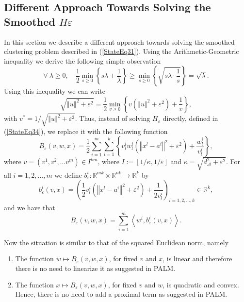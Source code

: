 \documentclass[11pt]{article}
\numberwithin{equation}{section}
\newcommand{\rr}{\mathbb{R}} %
\newcommand{\norm}[1]{\left\Vert {#1} \right\Vert} %
\begin{document}
\newpage

\subsection{Different Approach Towards Solving the Smoothed $H\varepsilon$}
In this section we describe a different approach towards solving the smoothed clustering problem described in (\ref{StateEq31}). Using the  Arithmetic-Geometric inequality we derive the following simple observation
\begin{equation*}
	\forall \: \lambda \geq 0, \quad \frac{1}{2} \min\limits_{s \geq 0} \left\lbrace s\lambda + \frac{1}{\lambda} \right\rbrace \geq \min\limits_{s \geq 0} \left\lbrace \sqrt{s\lambda \cdot \frac{1}{s}} \right\rbrace = \sqrt{\lambda} .
\end{equation*}
Using this inequality we can write
\begin{equation}
	\sqrt{\norm{u}^2 + {\varepsilon}^2} = \frac{1}{2}\min\limits_{v \geq 0} \left\lbrace v\left( \norm{u}^2 + {\varepsilon}^2\right) + \frac{1}{v} \right\rbrace , \label{AG_inq}
\end{equation}
with $v^* = 1/\sqrt{\norm{u}^2 + {\varepsilon}^2}$.
Thus, instead of solving $H_\varepsilon$ directly, defined in (\ref{StateEq34}), we replace it with the following function
\begin{equation}
	B_{\varepsilon}(v,w,x) = \frac{1}{2}\sum\limits_{i=1}^{m} \sum\limits_{l=1}^{k} \left\lbrace v^i_lw^i_l \left( \norm{x^l-a^i}^2 +{\varepsilon}^2 \right) + \frac{w^i_l}{v^i_l} \right\rbrace ,
\end{equation}
where $v = \left(v^1, v^2, \ldots v^m \right) \in I^{km}$, where $I:=\left[1/\kappa, 1/\varepsilon\right]$ and $\kappa = \sqrt{ d_{\mathcal{A}}^2 + {\varepsilon}^2}$. For all $i=1,2,\ldots,m$ we define $b^i_{\varepsilon}: \rr^{mk} \times \rr^{nk} \rightarrow \rr^{k}$ by
\begin{equation*}
	b^i_{\varepsilon}(v,x)= \left( \frac{1}{2} v^i_l \left( \norm{x^l-a^i}^2 +{\varepsilon}^2 \right) + \frac{1}{2v^i_l} \right)_{l=1,2,\ldots,k} \in \rr^{k} ,
\end{equation*}
and we have that
\begin{equation}
	B_{\varepsilon}(v,w,x) = \sum\limits_{i=1}^m \left\langle w^i, b^i_{\varepsilon}(v,x) \right\rangle . \label{B_eq_sum_b}
\end{equation}

Now the situation is similar to that of the squared Euclidean norm, namely
\begin{enumerate}[(1)]
	\item The function $w \mapsto B_{\varepsilon}(v,w,x)$, for fixed $v$ and $x$, is linear and therefore there is no need to linearize it as suggested in PALM.
	\item The function $x \mapsto B_{\varepsilon}(v,w,x)$, for fixed $v$ and $w$, is quadratic and convex. Hence, there is no need to add a proximal term as suggested in PALM.
\end{enumerate}
\end{document}
